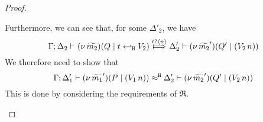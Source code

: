 \begin{proof}
\begin{enumerate}[$-$]
\begin{enumerate}[(a)]
\begin{enumerate}[i)]
							Furthermore, we can see that, for some $\Delta'_2$, we have
							\[
								\horel{\Gamma}{\Delta_2}{\newsp{\widetilde{m_2}}{Q \Par \htrigger{t}{V_2}  } }
								{\Hby{\bactinp{t}{n}}}
								{\Delta_2'}{\newsp{\widetilde{m_2}'}{Q' \Par (\appl{V_2}{n})}}
							\]
							We therefore need to show that
							\[
								\Gamma; \Delta_1' \vdash (\nu\, \widetilde{m_1}')(P \;|\; (V_1\, {n})) \approx^\mathtt{H} \Delta_2' \vdash (\nu\, \widetilde{m_2}')(Q' \;|\; (V_2\, {n}))
							\]
							This is done by considering the requirements of $\Re$.


\end{enumerate}
\end{enumerate}
\end{enumerate}
\end{proof}
